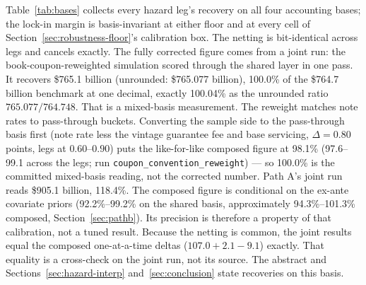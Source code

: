\documentclass[12pt]{article}
\begin{document}
Table~\ref{tab:bases} collects every hazard leg's recovery on all four accounting bases; the lock-in margin is basis-invariant at either floor and at every cell of Section~\ref{sec:robustness-floor}'s calibration box. The netting is bit-identical across legs and cancels exactly. The fully corrected figure comes from a joint run: the book-coupon-reweighted simulation scored through the shared layer in one pass. It recovers \$765.1 billion (unrounded: \$765.077 billion), 100.0\% of the \$764.7 billion benchmark at one decimal, exactly 100.04\% as the unrounded ratio $765.077/764.748$. That is a mixed-basis measurement. The reweight matches note rates to pass-through buckets. Converting the sample side to the pass-through basis first (note rate less the vintage guarantee fee and base servicing, $\Delta = 0.80$ points, legs at $0.60$--$0.90$) puts the like-for-like composed figure at 98.1\% (97.6--99.1 across the legs; run \texttt{coupon\_convention\_reweight}) --- so 100.0\% is the committed mixed-basis reading, not the corrected number. Path A's joint run reads \$905.1 billion, 118.4\%. The composed figure is conditional on the ex-ante covariate priors (92.2\%--99.2\% on the shared basis, approximately 94.3\%--101.3\% composed, Section~\ref{sec:pathb}). Its precision is therefore a property of that calibration, not a tuned result. Because the netting is common, the joint results equal the composed one-at-a-time deltas ($107.0 + 2.1 - 9.1$) exactly. That equality is a cross-check on the joint run, not its source. The abstract and Sections~\ref{sec:hazard-interp} and~\ref{sec:conclusion} state recoveries on this basis.
\end{document}
